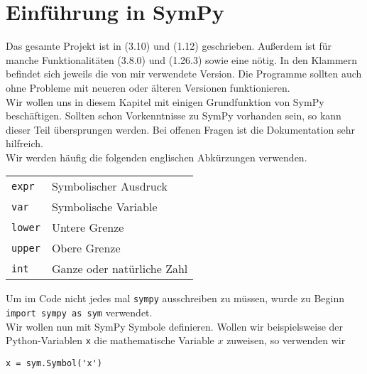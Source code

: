 \section{Einführung in SymPy}
\setcounter{page}{1}
\hypertarget{Sec:Einführung_in_SymPy}{}

Das gesamte Projekt ist in \href{https://www.python.org/downloads/}{} (3.10) und \href{https://github.com/sympy/sympy}{} (1.12) geschrieben. Außerdem ist für manche Funktionalitäten \href{https://matplotlib.org/}{} (3.8.0) und \href{https://numpy.org/}{} (1.26.3) sowie eine \href{https://www.latex-project.org/}{} nötig. In den Klammern befindet sich jeweils die von mir verwendete Version. Die Programme sollten auch ohne Probleme mit neueren oder älteren Versionen funktionieren.\\

Wir wollen uns in diesem Kapitel mit einigen Grundfunktion von SymPy beschäftigen. Sollten schon Vorkenntnisse zu SymPy vorhanden sein, so kann dieser Teil übersprungen werden. Bei offenen Fragen ist die Dokumentation \cite{SymPy} sehr hilfreich.\\

Wir werden häufig die folgenden englischen Abkürzungen verwenden.

\begin{center}
\begin{tabularx}{0.5\linewidth}{l l}
\lstinline|expr| & Symbolischer Ausdruck\\
\lstinline|var| & Symbolische Variable\\
\lstinline|lower| & Untere Grenze\\
\lstinline|upper| & Obere Grenze\\
\lstinline|int| & Ganze oder natürliche Zahl 
\end{tabularx}
\end{center}

Um im Code nicht jedes mal \lstinline|sympy| ausschreiben zu müssen, wurde zu Beginn \lstinline|import sympy as sym| verwendet.\\

Wir wollen nun mit SymPy Symbole definieren. Wollen wir beispielsweise der Python-Variablen \lstinline|x| die mathematische Variable $x$ zuweisen, so verwenden wir

\begin{lstlisting}
x = sym.Symbol('x')
\end{lstlisting}

